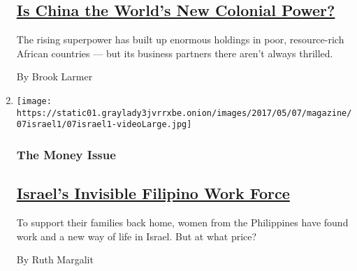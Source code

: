 \begin{enumerate}
  \hypertarget{is-china-the-worlds-new-colonial-power}{%
  \subsection{\texorpdfstring{\href{/2017/05/02/magazine/is-china-the-worlds-new-colonial-power.html}{Is
  China the World's New Colonial
  Power?}}{Is China the World's New Colonial Power?}}\label{is-china-the-worlds-new-colonial-power}}

  The rising superpower has built up enormous holdings in poor,
  resource-rich African countries --- but its business partners there
  aren't always thrilled.

  By Brook Larmer
\item
  \texttt{[image: https://static01.graylady3jvrrxbe.onion/images/2017/05/07/magazine/07israel1/07israel1-videoLarge.jpg]}

  \hypertarget{the-money-issue-4}{%
  \subsubsection{The Money Issue}\label{the-money-issue-4}}

  \hypertarget{israels-invisible-filipino-work-force}{%
  \subsection{\texorpdfstring{\href{/2017/05/03/magazine/israels-invisible-filipino-work-force.html}{Israel's
  Invisible Filipino Work
  Force}}{Israel's Invisible Filipino Work Force}}\label{israels-invisible-filipino-work-force}}

  To support their families back home, women from the Philippines have
  found work and a new way of life in Israel. But at what price?

  By Ruth Margalit
\end{enumerate}

